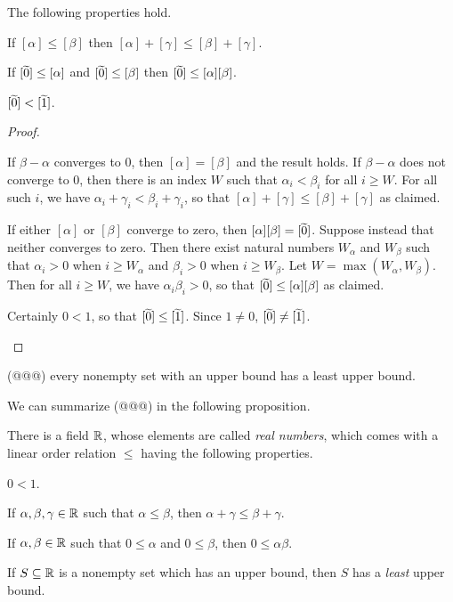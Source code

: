 \begin{prop}
The following properties hold.
\begin{proplist}
\item If \([\alpha] \leq [\beta]\) then \([\alpha] + [\gamma] \leq [\beta] + [\gamma]\).
\item If \([\widetilde{0}] \leq [\alpha]\) and \([\widetilde{0}] \leq [\beta]\) then \([\widetilde{0}] \leq [\alpha][\beta]\).
\item \([\widetilde{0}] < [\widetilde{1}]\).
\end{proplist}
\end{prop}

\begin{proof}\mbox{}
\begin{proplist}
\item If \(\beta - \alpha\) converges to 0, then \([\alpha] = [\beta]\) and the result holds.
If \(\beta - \alpha\) does not converge to 0, then there is an index \(W\) such that \(\alpha_i < \beta_i\) for all \(i \geq W\).
For all such \(i\), we have \(\alpha_i + \gamma_i < \beta_i + \gamma_i\), so that \([\alpha] + [\gamma] \leq [\beta] + [\gamma]\) as claimed.
\item If either \([\alpha]\) or \([\beta]\) converge to zero, then \([\alpha][\beta] = [\widetilde{0}]\).
Suppose instead that neither converges to zero.
Then there exist natural numbers \(W_\alpha\) and \(W_\beta\) such that \(\alpha_i > 0\) when \(i \geq W_\alpha\) and \(\beta_i > 0\) when \(i \geq W_\beta\).
Let \(W = \max(W_\alpha, W_\beta)\).
Then for all \(i \geq W\), we have \(\alpha_i \beta_i > 0\), so that \([\widetilde{0}] \leq [\alpha][\beta]\) as claimed.
\item Certainly \(0 < 1\), so that \([\widetilde{0}] \leq [\widetilde{1}]\).
Since \(1 \neq 0\), \([\widetilde{0}] \neq [\widetilde{1}]\).
\end{proplist}
\end{proof}

\begin{prop}
(@@@) every nonempty set with an upper bound has a least upper bound.
\end{prop}

We can summarize (@@@) in the following proposition.

\begin{prop} \label{prop:rr-axioms}
There is a field \(\mathbb{R}\), whose elements are called \emph{real numbers}, which comes with a linear order relation \(\leq\) having the following properties.
\begin{proplist}
\item \(0 < 1\).
\item If \(\alpha, \beta, \gamma \in \mathbb{R}\) such that \(\alpha \leq \beta\), then \(\alpha + \gamma \leq \beta + \gamma\).
\item If \(\alpha, \beta \in \mathbb{R}\) such that \(0 \leq \alpha\) and \(0 \leq \beta\), then \(0 \leq \alpha\beta\).
\item If \(S \subseteq \mathbb{R}\) is a nonempty set which has an upper bound, then \(S\) has a \emph{least} upper bound.
\end{proplist}
\end{prop}

